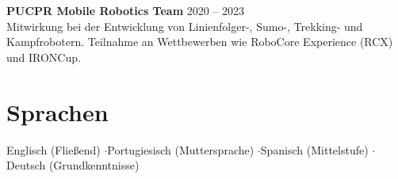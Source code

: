 \documentclass[11pt,a4paper]{article}
\begin{document}
\vspace{3pt}

\textbf{PUCPR Mobile Robotics Team} \hfill 2020 -- 2023 \\
Mitwirkung bei der Entwicklung von Linienfolger-, Sumo-, Trekking- und Kampfrobotern. Teilnahme an Wettbewerben wie RoboCore Experience (RCX) und IRONCup.

\section{Sprachen}

\noindent Englisch (Fließend) \enspace$\cdot$\enspace Portugiesisch (Muttersprache) \enspace$\cdot$\enspace Spanisch (Mittelstufe) \enspace$\cdot$\enspace Deutsch (Grundkenntnisse)
\end{document}
